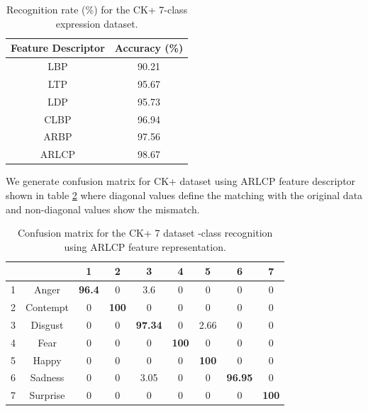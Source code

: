 \documentclass[12pt]{article}
\begin{document}
\begin{table}[H]
	\begin{center}
		\caption{Recognition rate (\%) for the CK+ 7-class expression dataset.} 
		\label{tab:ck_plus_recognition_rate}
		
		\begin{tabular}{|c|c|}
			
			\hline
			\textbf{Feature Descriptor } & \textbf{Accuracy (\%)}\\
			\hline
			LBP & 90.21 \\
			LTP & 95.67 \\
			LDP & 95.73 \\
			CLBP & 96.94 \\
			ARBP & 97.56 \\
			ARLCP & 98.67 \\
			\hline
			
		\end{tabular}
	\end{center}
\end{table}
\noindent We generate confusion matrix for CK+ dataset using ARLCP feature descriptor shown in table \ref{tab:ck_plus_confusion_matrix} where diagonal values define the matching with the original data and non-diagonal values show the mismatch.\\
\begin{table}[H]
	\begin{center}
				\caption{Confusion matrix for the CK+ 7 dataset -class recognition using ARLCP feature representation.} 
		\begin{tabular}{|c|c|c|c|c|c|c|c|c|}
			
			\hline
			& & 1 & 2 & 3 & 4 & 5 & 6 & 7 \\
			\hline
			1 & Anger & \textbf{96.4} & 0 &  3.6 & 0 & 0 &  0  & 0 \\
			\hline
			2 & Contempt & 0 & \textbf{100} & 0 & 0 & 0 &  0  & 0  \\
			\hline
			3 & Disgust & 0  & 0 & \textbf{97.34} & 0 & 2.66 &  0  & 0  \\
			\hline
			4 & Fear & 0  & 0  & 0 & \textbf{100} & 0 &  0  & 0  \\
			\hline
			5 & Happy & 0 & 0 & 0 & 0 & \textbf{100} & 0 & 0  \\
			\hline
			6 & Sadness & 0 & 0 & 3.05 & 0 &  0 & \textbf{96.95} & 0  \\
			\hline
			7 & Surprise & 0 & 0 & 0 & 0 &  0  & 0 & \textbf{100}  \\
			\hline
			
			
		\end{tabular}
		\label{tab:ck_plus_confusion_matrix}
		
	\end{center}
\end{table}
\end{document}
